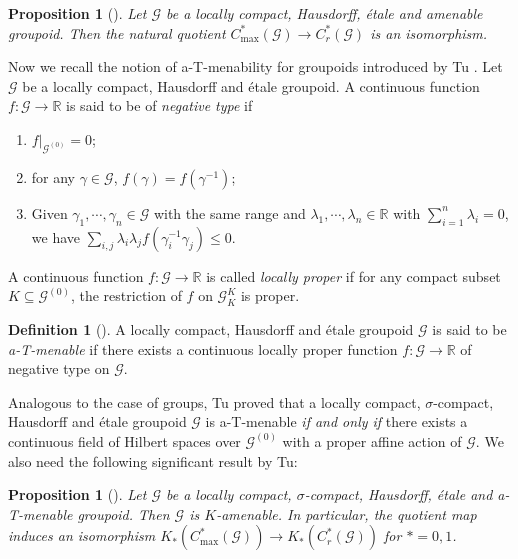 \documentclass[12pt, a4paper]{amsart}
\numberwithin{equation}{section}
\newtheorem{prop}[thm]{Proposition}
\theoremstyle{definition}
\newtheorem{defn}[thm]{Definition}
\theoremstyle{remark}
\def\RR{\mathbb{R}}
\def\G{\mathcal{G}}
\def\Gz{\mathcal{G}^{(0)}}
\def\max{\mathrm{max}}
\begin{document}
\begin{prop}[{\cite[Corollary 5.6.17]{BO08}}]\label{prop: etale amen}
Let $\G$ be a locally compact, Hausdorff, \'{e}tale and amenable groupoid. Then the natural quotient $C^*_{\max}(\G) \to C^*_r(\G)$ is an isomorphism.
\end{prop}






Now we recall the notion of a-T-menability for groupoids introduced by Tu \cite{Tu99}. Let $\G$ be a locally compact, Hausdorff and \'{e}tale groupoid. A continuous function $f: \G \to \RR$ is said to be of \emph{negative type} if 
\begin{enumerate}
 \item $f|_{\Gz}=0$;
 \item for any $\gamma\in \G$, $f(\gamma) = f(\gamma^{-1})$;
 \item Given $\gamma_1, \cdots, \gamma_n \in \G$ with the same range and $\lambda_1, \cdots, \lambda_n \in \RR$ with $\sum_{i=1}^n \lambda_i=0$, we have $\sum_{i,j} \lambda_i\lambda_jf(\gamma_i^{-1}\gamma_j) \leq 0$. 
\end{enumerate}
A continuous function $f: \G \to \RR$ is called \emph{locally proper} if for any compact subset $K \subseteq \Gz$, the restriction of $f$ on $\G_K^K$ is proper.

\begin{defn}[{\cite[Section 3.3]{Tu99}}]\label{defn: a-T-menable groupoids}
A locally compact, Hausdorff and \'{e}tale groupoid $\G$ is said to be \emph{a-T-menable} if there exists a continuous locally proper function $f: \G \to \RR$ of negative type on $\G$.
\end{defn}

Analogous to the case of groups, Tu \cite{Tu99} proved that a locally compact, $\sigma$-compact, Hausdorff and \'{e}tale groupoid $\G$ is a-T-menable \emph{if and only if} there exists a continuous field of Hilbert spaces over $\Gz$ with a proper affine action of $\G$. We also need the following significant result by Tu:

\begin{prop}[{\cite[Th\'{e}or\`{e}me 0.1]{Tu99}}]\label{prop: a-T-menable groupoids are K-amenable}
Let $\G$ be a locally compact, $\sigma$-compact, Hausdorff, \'{e}tale and a-T-menable groupoid. Then $\G$ is \emph{$K$-amenable}. In particular, the quotient map induces an isomorphism $K_\ast(C^*_{\max}(\G)) \to K_\ast(C^*_r(\G))$ for $\ast=0,1$.
\end{prop}
\end{document}
